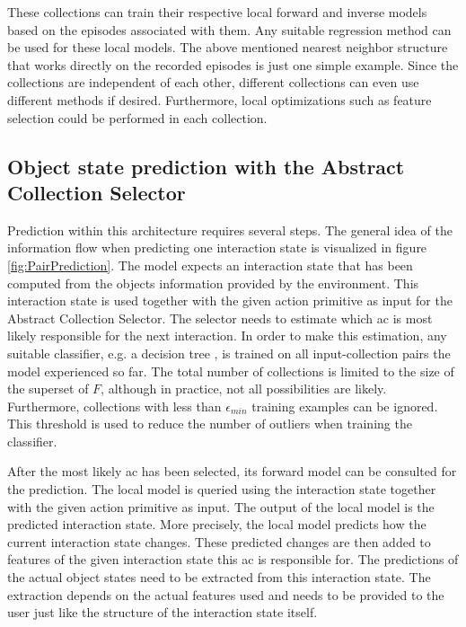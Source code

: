These collections can train their respective local forward and inverse models based on the episodes associated with them. Any suitable regression method can be used for these local models. The above mentioned nearest neighbor structure that works directly on the recorded episodes is just one simple example. Since the collections are independent of each other, different collections can even use different methods if desired. Furthermore, local optimizations such as feature selection could be performed in each collection. %

\subsection{Object state prediction with the Abstract Collection Selector \label{sec:pairPrediction}}

Prediction within this architecture requires several steps. The general idea of the information flow when predicting one interaction state is visualized in figure \ref{fig:PairPrediction}. The model expects an interaction state that has been computed from the objects information provided by the environment. This interaction state is used together with the given action primitive as input for the Abstract Collection Selector. The selector needs to estimate which \gls{ac} is most likely responsible for the next interaction. In order to make this estimation, any suitable classifier, e.g. a decision tree \cite{decisionTree}, is trained on all input-collection pairs the model experienced so far. 
The total number of collections is limited to the size of the superset of $F$, although in practice, not all possibilities are likely. Furthermore, collections with less than $\epsilon_{min}$ training examples can be ignored. This threshold is used to reduce the number of outliers when training the classifier. %

After the most likely \gls{ac} has been selected, its forward model can be consulted for the prediction. The local model is queried using the interaction state together with the given action primitive as input. The output of the local model is the predicted interaction state. 
More precisely, the local model predicts how the current interaction state changes. These predicted changes are then added to features of the given interaction state this \gls{ac} is responsible for.
The predictions of the actual object states need to be extracted from this interaction state. The extraction depends on the actual features used and needs to be provided to the user just like the structure of the interaction state itself.

